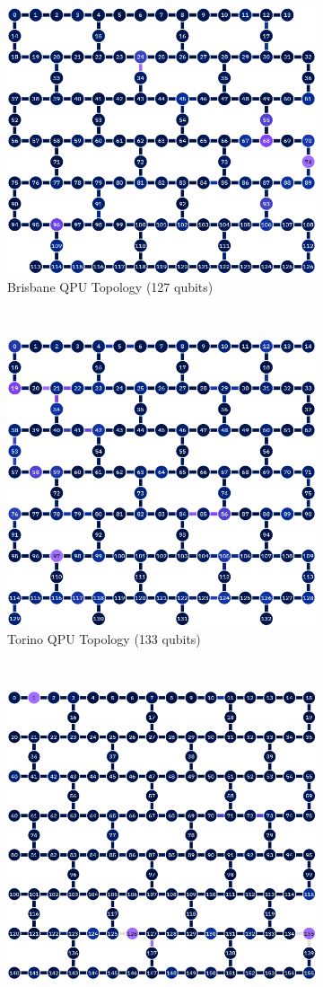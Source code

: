 \documentclass[conference,twoside]{IEEEtran}
\begin{document}
\begin{figure}[!htbp]
    \centering
    \begin{subfigure}{\columnwidth}
        \centering
        \includegraphics[width=0.5\columnwidth,keepaspectratio]{ibm_brisbane_calibrations_readout_error_ecr_map_2025-05-25T11_17_00Z.png}\\
        \small{Brisbane QPU Topology (127 qubits)}\\
    \end{subfigure}\\[0pt]
    \begin{subfigure}{\columnwidth}
        \centering
        \includegraphics[width=0.5\columnwidth,keepaspectratio]{ibm_torino_calibrations_readout_error_cz_map_2025-05-25T02_19_58Z.png}\\
        \small{Torino QPU Topology (133 qubits)}\\
    \end{subfigure}\\[0pt]
    \begin{subfigure}{\columnwidth}
        \centering
        \includegraphics[width=0.5\columnwidth,keepaspectratio]{ibm_aachen_calibrations_readout_error_cz_map_2025-05-25T11_46_51Z.png}\\

\end{subfigure}
\end{figure}
\end{document}

